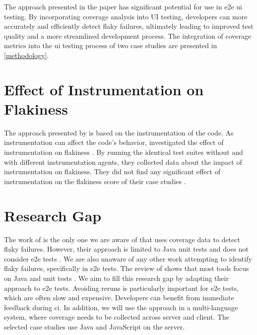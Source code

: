The approach presented in the  paper has significant potential for use in \ac{e2e} \ac{ui} testing.
By incorporating coverage analysis into UI testing, developers can more accurately and efficiently detect flaky failures, ultimately leading to improved test quality and a more streamlined development process.
The integration of coverage metrics into the \ac{ui} testing process of two case studies are presented in \cref{methodology}.

\section{Effect of Instrumentation on Flakiness}
The approach presented by \citeauthor*{bell_deflaker_2018} is based on the instrumentation of the code.
As instrumentation can affect the code's behavior, \citeauthor*{rasheed_effect_2023} investigated the effect of instrumentation on flakiness \autocite{rasheed_effect_2023}.
By running the identical test suites without and with different instrumentation agents, they collected data about the impact of instrumentation on flakiness.
They did not find any significant effect of instrumentation on the flakiness score of their case studies \autocite{rasheed_effect_2023}.


\section{Research Gap}
The work of \citeauthor*{bell_deflaker_2018} is the only one we are aware of that uses coverage data to detect flaky failures.
However, their approach is limited to Java unit tests and does not consider \ac{e2e} tests \autocite{bell_deflaker_2018}.
We are also unaware of any other work attempting to identify flaky failures, specifically in \ac{e2e} tests.
The review of \citeauthor*{rasheed_test_2022} shows that most tools focus on Java and unit tests \autocite{rasheed_test_2022}.
We aim to fill this research gap by adapting their approach to \ac{e2e} tests.
Avoiding reruns is particularly important for \ac{e2e} tests, which are often slow and expensive.
Developers can benefit from immediate feedback during \ac{ci}.
In addition, we will use the approach in a multi-language system, where coverage needs to be collected across server and client.
The selected case studies use Java and JavaScript on the server.


